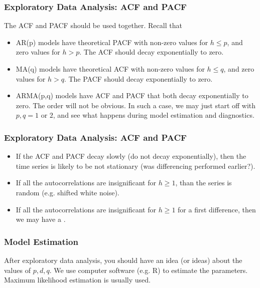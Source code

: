 \documentclass[%
xcolor=pdftex]{beamer}
\begin{document}
\begin{frame}
\frametitle{Exploratory Data Analysis: ACF and PACF}

The ACF and PACF should be used together. Recall that

\begin{itemize}
\item AR(p) models have theoretical PACF with non-zero values for $h \leq p$, and zero values for $h>p$. The ACF should decay exponentially to zero.
\item MA(q) models have theoretical ACF with non-zero values for $h \leq q$, and zero values for $h>q$. The PACF should decay exponentially to zero.
\item ARMA(p,q) models have ACF and PACF that both decay exponentially to zero. The order will not be obvious. In such a case, we may just start off with $p,q = 1 \text{ or } 2$, and see what happens during model estimation and diagnostics.
\end{itemize}


\end{frame}

\begin{frame}
\frametitle{Exploratory Data Analysis: ACF and PACF}

\begin{itemize}
\item If the ACF and PACF decay slowly (do not decay exponentially), then the time series is likely to be not stationary (was differencing performed earlier?).
\item If all the autocorrelations are insignificant for $h \geq 1$, than the series is random (e.g. shifted white noise).
\item If all the autocorrelations are insignificant for $h \geq 1$ for a first difference, then we may have a \underline{\hspace{25 mm}}.
\end{itemize}


\end{frame}


\begin{frame}
\frametitle{Model Estimation}

After exploratory data analysis, you should have an idea (or ideas) about the values of $p,d,q$. We use computer software (e.g. R) to estimate the parameters. Maximum likelihood estimation is usually used.

\end{frame}
\end{document}
